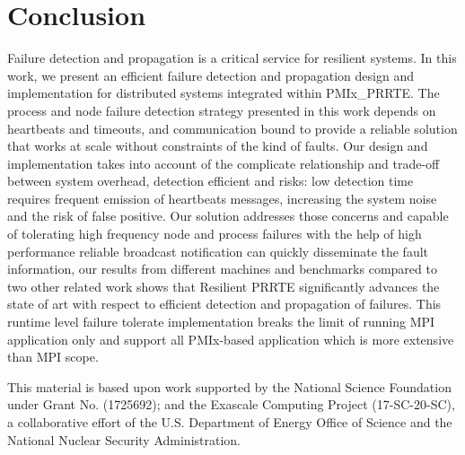 \documentclass[sigconf]{acmart}
\begin{document}
\section{Conclusion}
Failure detection and propagation is a critical service for resilient systems. In this work, we present an efficient failure detection and propagation design and implementation for distributed systems integrated within PMIx\_PRRTE. The process and node failure detection strategy presented in this work depends on heartbeats and timeouts, and communication bound to provide a reliable solution that works at scale without constraints of the kind of faults. Our design and implementation takes into account of the complicate relationship and trade-off between system overhead, detection efficient and risks: low detection time requires frequent emission of heartbeats messages, increasing the system noise and the risk of false positive. Our solution addresses those concerns and capable of tolerating high frequency node and process failures with the help of high performance reliable broadcast notification can quickly disseminate the fault information, our results from different machines and benchmarks compared to two other related work shows that Resilient PRRTE significantly advances the state of art with respect to efficient detection and propagation of failures. This runtime level failure tolerate implementation breaks the limit of running MPI  application only and support all PMIx-based application which is more extensive than MPI scope.   


%
\begin{acks}
This material is based upon work supported by the National Science Foundation under Grant No. (1725692); and the Exascale Computing Project (17-SC-20-SC), a collaborative effort of the 
U.S. Department of Energy Office of Science and the National Nuclear Security Administration.    
\end{acks}

%


\end{document}
